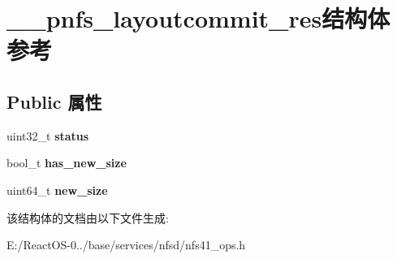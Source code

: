 \hypertarget{struct____pnfs__layoutcommit__res}{}\section{\+\_\+\+\_\+pnfs\+\_\+layoutcommit\+\_\+res结构体 参考}
\label{struct____pnfs__layoutcommit__res}
\subsection*{Public 属性}
\begin{DoxyCompactItemize}
\item 
\mbox{\label{struct____pnfs__layoutcommit__res_a0de3b224c18b7881b2e0996b6875e48d}} 
uint32\+\_\+t {\bfseries status}
\item 
\mbox{\label{struct____pnfs__layoutcommit__res_a962f3379f1b6eb44f83944ab79470339}} 
bool\+\_\+t {\bfseries has\+\_\+new\+\_\+size}
\item 
\mbox{\label{struct____pnfs__layoutcommit__res_a5ed4843296f9d6874c913376650ed708}} 
uint64\+\_\+t {\bfseries new\+\_\+size}
\end{DoxyCompactItemize}


该结构体的文档由以下文件生成\+:\begin{DoxyCompactItemize}
\item 
E\+:/\+React\+O\+S-\/0../base/services/nfsd/nfs41\+\_\+ops.\+h\end{DoxyCompactItemize}

